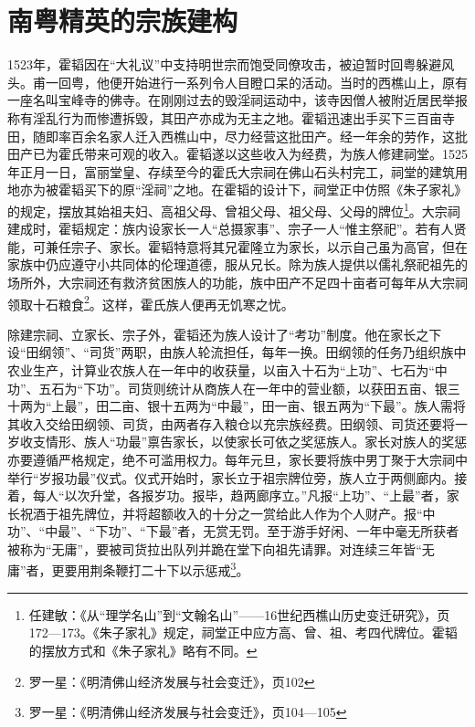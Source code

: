 \section{南粤精英的宗族建构}

1523年，霍韬因在“大礼议”中支持明世宗而饱受同僚攻击，被迫暂时回粤躲避风头。甫一回粤，他便开始进行一系列令人目瞪口呆的活动。当时的西樵山上，原有一座名叫宝峰寺的佛寺。在刚刚过去的毁淫祠运动中，该寺因僧人被附近居民举报称有淫乱行为而惨遭拆毁，其田产亦成为无主之地。霍韬迅速出手买下三百亩寺田，随即率百余名家人迁入西樵山中，尽力经营这批田产。经一年余的劳作，这批田产已为霍氏带来可观的收入。霍韬遂以这些收入为经费，为族人修建祠堂。1525年正月一日，富丽堂皇、存续至今的霍氏大宗祠在佛山石头村完工，祠堂的建筑用地亦为被霍韬买下的原“淫祠”之地。在霍韬的设计下，祠堂正中仿照《朱子家礼》的规定，摆放其始祖夫妇、高祖父母、曾祖父母、祖父母、父母的牌位\footnote{任建敏：《从“理学名山”到“文翰名山”——16世纪西樵山历史变迁研究》，页172—173。《朱子家礼》规定，祠堂正中应方高、曾、祖、考四代牌位。霍韬的摆放方式和《朱子家礼》略有不同。}。大宗祠建成时，霍韬规定：族内设家长一人“总摄家事”、宗子一人“惟主祭祀”。若有人贤能，可兼任宗子、家长。霍韬特意将其兄霍隆立为家长，以示自己虽为高官，但在家族中仍应遵守小共同体的伦理道德，服从兄长。除为族人提供以儒礼祭祀祖先的场所外，大宗祠还有救济贫困族人的功能，族中田产不足四十亩者可每年从大宗祠领取十石粮食\footnote{罗一星：《明清佛山经济发展与社会变迁》，页102}。这样，霍氏族人便再无饥寒之忧。

除建宗祠、立家长、宗子外，霍韬还为族人设计了“考功”制度。他在家长之下设“田纲领”、“司货”两职，由族人轮流担任，每年一换。田纲领的任务乃组织族中农业生产，计算业农族人在一年中的收获量，以亩入十石为“上功”、七石为“中功”、五石为“下功”。司货则统计从商族人在一年中的营业额，以获田五亩、银三十两为“上最”，田二亩、银十五两为“中最”，田一亩、银五两为“下最”。族人需将其收入交给田纲领、司货，由两者存入粮仓以充宗族经费。田纲领、司货还要将一岁收支情形、族人“功最”禀告家长，以使家长可依之奖惩族人。家长对族人的奖惩亦要遵循严格规定，绝不可滥用权力。每年元旦，家长要将族中男丁聚于大宗祠中举行“岁报功最”仪式。仪式开始时，家长立于祖宗牌位旁，族人立于两侧廊内。接着，每人“以次升堂，各报岁功。报毕，趋两廊序立。”凡报“上功”、“上最”者，家长祝酒于祖先牌位，并将超额收入的十分之一赏给此人作为个人财产。报“中功”、“中最”、“下功”、“下最”者，无赏无罚。至于游手好闲、一年中毫无所获者被称为“无庸”，要被司货拉出队列并跪在堂下向祖先请罪。对连续三年皆“无庸”者，更要用荆条鞭打二十下以示惩戒\footnote{罗一星：《明清佛山经济发展与社会变迁》，页104—105}。

